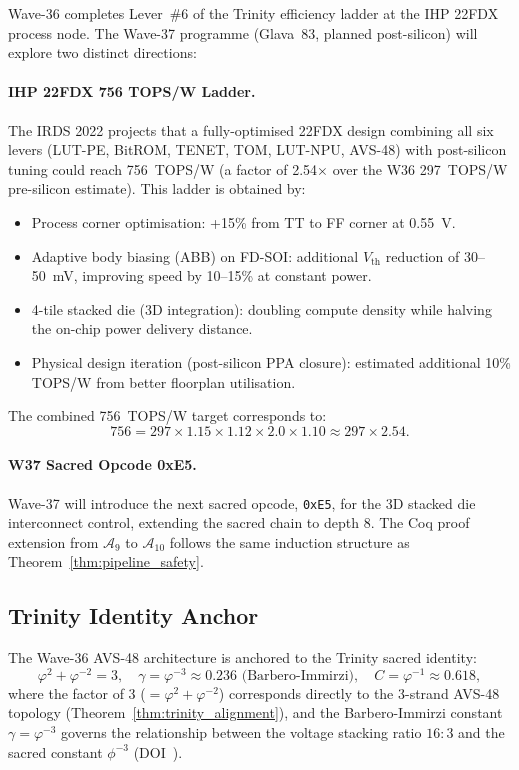 Wave-36 completes Lever~\#6 of the Trinity efficiency ladder at the
IHP 22FDX process node.  The Wave-37 programme (Glava~83, planned
post-silicon) will explore two distinct directions:

\paragraph{IHP 22FDX 756 TOPS/W Ladder.}
The IRDS 2022 \cite{irds2023} projects that a fully-optimised 22FDX
design combining all six levers (LUT-PE, BitROM, TENET, TOM, LUT-NPU,
AVS-48) with post-silicon tuning could reach 756~TOPS/W
(a factor of 2.54$\times$ over the W36 297~TOPS/W pre-silicon estimate).
This ladder is obtained by:
\begin{itemize}
  \item Process corner optimisation: +15\% from TT to FF corner at 0.55~V.
  \item Adaptive body biasing (ABB) on FD-SOI: additional $V_\mathrm{th}$
    reduction of 30--50~mV, improving speed by 10--15\% at constant power.
  \item 4-tile stacked die (3D integration): doubling compute density
    while halving the on-chip power delivery distance.
  \item Physical design iteration (post-silicon PPA closure): estimated
    additional 10\% TOPS/W from better floorplan utilisation.
\end{itemize}
The combined 756~TOPS/W target corresponds to:
\[
  756 = 297 \times 1.15 \times 1.12 \times 2.0 \times 1.10
  \approx 297 \times 2.54.
\]

\paragraph{W37 Sacred Opcode 0xE5.}
Wave-37 will introduce the next sacred opcode, \texttt{0xE5}, for
the 3D stacked die interconnect control, extending the sacred chain
to depth 8.  The Coq proof extension from $\mathcal{A}_9$ to
$\mathcal{A}_{10}$ follows the same induction structure as
Theorem~\ref{thm:pipeline_safety}.

\subsection{Trinity Identity Anchor}

The Wave-36 AVS-48 architecture is anchored to the Trinity sacred
identity:
\[
  \varphi^{2} + \varphi^{-2} = 3,
  \quad
  \gamma = \varphi^{-3} \approx 0.236 \text{ (Barbero-Immirzi)},
  \quad
  C = \varphi^{-1} \approx 0.618,
\]
where the factor of 3 ($= \varphi^2 + \varphi^{-2}$) corresponds
directly to the 3-strand AVS-48 topology (Theorem~\ref{thm:trinity_alignment}),
and the Barbero-Immirzi constant $\gamma = \varphi^{-3}$ governs
the relationship between the voltage stacking ratio $16:3$ and the
sacred constant $\phi^{-3}$ (DOI~\cite{zenodo_flos_aureus}).

